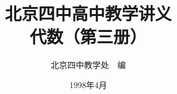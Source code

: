 \documentclass[a4paper, openany]{ctexbook}
\theoremstyle{plain}
\begin{document}
\title{\Huge\bfseries 北京四中高中教学讲义\\代数（第三册）}
\author{\Large 北京四中教学处~~编}
\date{\Large 1998年4月}

\maketitle

\frontmatter


\tableofcontents

\mainmatter
\setcounter{chapter}{7}







\backmatter
\end{document}
